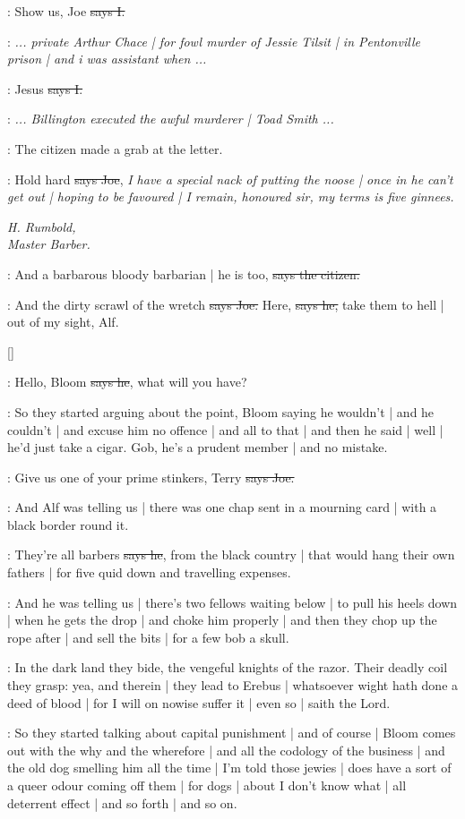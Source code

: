 :
Show us,
Joe
\sout{says I.}

\joe:
\emph{...
private Arthur Chace |
for fowl murder of Jessie Tilsit |
in Pentonville prison |
and i was assistant when ...}

:
Jesus
\sout{says I.}

\joe:
\emph{...
Billington executed the awful murderer |
Toad Smith ...}

\Nq:
The citizen made a grab at the letter.

\joe:
Hold hard
\sout{says Joe},
\emph{I have a special nack of putting the noose |
once in he can't get out |
hoping to be favoured |
I remain,
honoured sir,
my terms is five ginnees.}

\emph{%
H. Rumbold, \\
Master Barber.}

\citizen:
And a barbarous bloody barbarian |
he is too,
\sout{says the citizen.}

\joe:
And the dirty scrawl of the wretch
\sout{says Joe.}
Here,
\sout{says he,}
take them to hell |
out of my sight,
Alf.

[]

\joe:
Hello,
Bloom
\sout{says he},
what will you have?

\Nq:
So they started arguing about the point,
Bloom saying he wouldn't |
and he couldn't |
and excuse him no offence |
and all to that |
and then he said |
well |
he'd just take a cigar.
Gob,
he's a prudent member |
and no mistake.

\joe:
Give us one of your prime stinkers,
Terry
\sout{says Joe.}

\Nq:
And Alf was telling us |
there was one chap sent in a mourning card |
with a black border
round it.

\bergan:
They're all barbers
\sout{says he},
from the black country |
that would hang their own fathers |
for five quid down and travelling expenses.

\Nq:
And he was telling us |
there's two fellows waiting below |
to pull his heels down |
when he gets the drop |
and choke him properly |
and then they chop up the rope after |
and sell the bits |
for a few bob a skull.

:
In the dark land they bide,
the vengeful knights of the razor.
Their deadly coil they grasp:
yea,
and therein |
they lead to Erebus |
whatsoever wight hath done a deed of blood |
for I will on nowise suffer it |
even so |
saith the Lord.

\Nq:
So they started talking about capital punishment |
and of course |
Bloom comes out with the why and the wherefore |
and all the codology of the business |
and the old dog smelling him all the time |
I'm told those jewies |
does have a sort of a queer odour coming off them |
for dogs |
about I don't know what |
all deterrent effect |
and so forth |
and so on.

